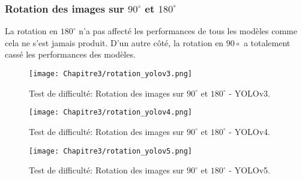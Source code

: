           \subsubsection{Rotation des images sur $90^\circ$ et $180^\circ$}
          La rotation en $180^\circ$ n'a pas affecté les performances de tous les modèles comme cela ne s'est jamais produit. D'un autre côté, la rotation en $90\circ$ a totalement cassé les performances des modèles.
          \begin{figure}[H]
               \centering
                \texttt{[image: Chapitre3/rotation\_yolov3.png]}
                \caption{Test de difficulté: Rotation des images sur $90^\circ$ et $180^\circ$ - YOLOv3.}
                \label{y3_t5}
                \end{figure}
          \begin{figure}[H]
                    \centering
                    \texttt{[image: Chapitre3/rotation\_yolov4.png]}
                    \caption{Test de difficulté: Rotation des images sur $90^\circ$ et $180^\circ$ - YOLOv4.}
                    \label{y4_t4}
                    \end{figure}
          \begin{figure}[H]
                    \centering
                    \texttt{[image: Chapitre3/rotation\_yolov5.png]}
                    \caption{Test de difficulté: Rotation des images sur $90^\circ$ et $180^\circ$ - YOLOv5.}
                    \label{y5_t4}
                    \end{figure}


